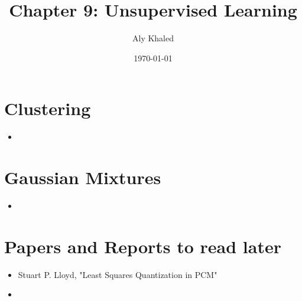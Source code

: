 \documentclass{article}
\title{Chapter 9: Unsupervised Learning}
\author{Aly Khaled}
\date{\today}
\begin{document}
 
    \maketitle
    \section{Clustering}
    \begin{itemize}
    	\item 
    \end{itemize}
    \section{Gaussian Mixtures}
    \begin{itemize}
    	\item 
	\end{itemize}								
    \section*{Papers and Reports to read later}
    \begin{itemize}
    	\item Stuart P. Lloyd, "Least Squares Quantization in PCM"
    	\item 
    \end{itemize}
\end{document}
